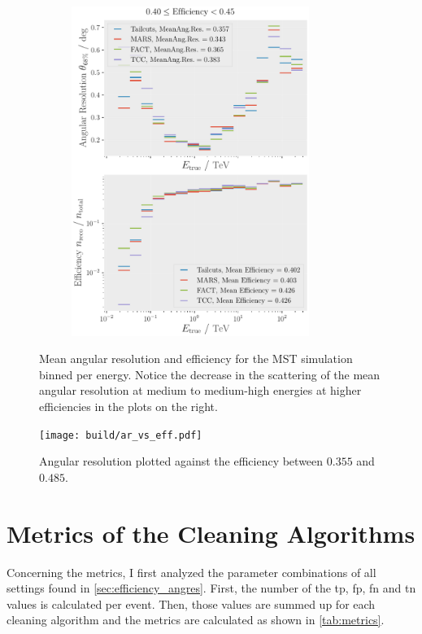 \begin{figure}
\begin{subfigure}{0.48\textwidth}
    \end{subfigure}
    \hfill
    \begin{subfigure}{0.48\textwidth}
        \centering
        \includegraphics[width=0.85\textwidth]{plots/ar_aeff/AR_Aeff_MST_0.40_0.45.pdf}
    \end{subfigure}
    \caption{Mean angular resolution and efficiency for the MST simulation binned per energy. Notice
    the decrease in the scattering of the mean angular resolution at medium to
    medium-high energies at higher efficiencies in the plots on the right.\vspace{-0.5cm}}
    \label{fig:efficiency_angres}
\end{figure}
\begin{figure}[!htbp]
    \centering
    \texttt{[image: build/ar\_vs\_eff.pdf]}
    \caption{Angular resolution plotted against the efficiency between \(\num{0.355}\) and \(\num{0.485}\).}
    \label{fig:ar_vs_eff}
\end{figure}


\section{Metrics of the Cleaning Algorithms}
\label{sec:metrics}
Concerning the metrics, I first analyzed the parameter combinations of all settings found in \autoref{sec:efficiency_angres}. First,
the number of the \gls{tp}, \gls{fp}, \gls{fn} and \gls{tn} values is calculated per event. Then,
those values are summed up for each cleaning algorithm and the metrics are calculated as shown in
\autoref{tab:metrics}.

